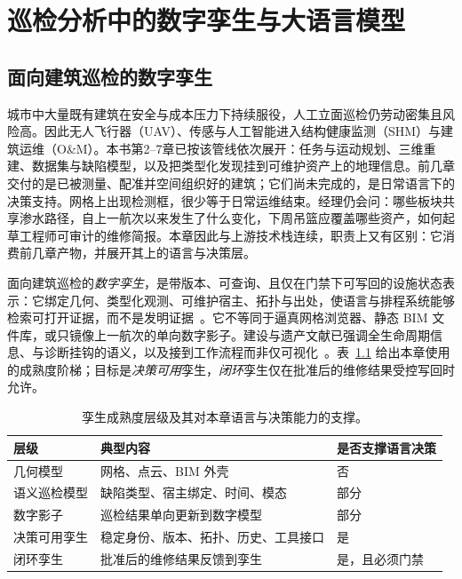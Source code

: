 \chapter{巡检分析中的数字孪生与大语言模型}
\label{ch:llm-dt}


\section{面向建筑巡检的数字孪生}
\label{sec:ch8-dt}

城市中大量既有建筑在安全与成本压力下持续服役，人工立面巡检仍劳动密集且风险高。因此无人飞行器（UAV）、传感与人工智能进入结构健康监测（SHM）与建筑运维（O\&M）。本书第2--7章已按该管线依次展开：任务与运动规划、三维重建、数据集与缺陷模型，以及把类型化发现挂到可维护资产上的地理信息。前几章交付的是已被测量、配准并空间组织好的建筑；它们尚未完成的，是日常语言下的决策支持。网格上出现检测框，很少等于日常运维结束。经理仍会问：哪些板块共享渗水路径，自上一航次以来发生了什么变化，下周吊篮应覆盖哪些资产，如何起草工程师可审计的维修简报。本章因此与上游技术栈连续，职责上又有区别：它消费前几章产物，并展开其上的语言与决策层。

面向建筑巡检的\emph{数字孪生}，是带版本、可查询、且仅在门禁下可写回的设施状态表示：它绑定几何、类型化观测、可维护宿主、拓扑与出处，使语言与排程系统能够检索可打开证据，而不是发明证据~\cite{boje2020,opoku2021,lu2020,chen2023facility}。它不等同于逼真网格浏览器、静态 BIM 文件库，或只镜像上一航次的单向数字影子。建设与遗产文献已强调全生命周期信息、与诊断挂钩的语义，以及接到工作流程而非仅可视化~\cite{bruno2018,tsilimantou2020,lu2020}。表~\ref{tab:ch8-twin-maturity} 给出本章使用的成熟度阶梯；目标是\emph{决策可用}孪生，\emph{闭环}孪生仅在批准后的维修结果受控写回时允许。

\begin{table}[htbp]
\centering
\caption{孪生成熟度层级及其对本章语言与决策能力的支撑。}
\label{tab:ch8-twin-maturity}
\begin{tabular}{llp{4.6cm}}
\toprule
层级 & 典型内容 & 是否支撑语言决策 \\
\midrule
几何模型 & 网格、点云、BIM 外壳 & 否 \\
语义巡检模型 & 缺陷类型、宿主绑定、时间、模态 & 部分 \\
数字影子 & 巡检结果单向更新到数字模型 & 部分 \\
决策可用孪生 & 稳定身份、版本、拓扑、历史、工具接口 & 是 \\
闭环孪生 & 批准后的维修结果反馈到孪生 & 是，且必须门禁 \\
\bottomrule
\end{tabular}
\end{table}

